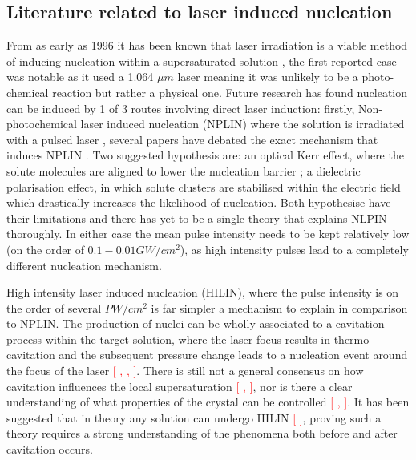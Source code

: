 \documentclass[a4paper,oneside,11pt]{book}
\begin{document}
\subsection{Literature related to laser induced nucleation}
From as early as 1996 it has been known that laser irradiation is a viable method of inducing nucleation within a supersaturated solution \cite{Garetz1996}, the first reported case was notable as it used a 1.064 $\mu m$ laser meaning it was unlikely to be a photo-chemical reaction but rather a physical one. Future research has found nucleation can be induced by 1 of 3 routes involving direct laser induction: firstly, Non-photochemical laser induced nucleation (NPLIN) where the solution is irradiated with a pulsed laser \cite{Garetz1996, Garetz2002,Sun2006}, several papers have debated the exact mechanism that induces NPLIN \cite{Garetz2002, Knott2011}. Two suggested hypothesis are: an optical Kerr effect, where the solute molecules are aligned to lower the nucleation barrier \cite{Knott2011}; a dielectric polarisation effect, in which solute clusters are stabilised within the electric field which drastically increases the likelihood of nucleation\cite{Alexander2008}. Both hypothesise have their limitations and there has yet to be a single theory that explains NLPIN thoroughly. In either case the mean pulse intensity needs to be kept relatively low (on the order of $0.1-0.01 GW/cm^2$), as high intensity pulses lead to a completely different nucleation mechanism.

High intensity laser induced nucleation (HILIN), where the pulse intensity is on the order of several $PW/cm^2$ is far simpler a mechanism to explain in comparison to NPLIN. The production of nuclei can be wholly associated to a cavitation process within the target solution, where the laser focus results in thermo-cavitation and the subsequent pressure change leads to a nucleation event around the focus of the laser \textcolor{red}{[ , , ]}. There is still not a general consensus on how cavitation influences the local supersaturation \textcolor{red}{[ , ]}, nor is there a clear understanding of what properties of the crystal can be controlled \textcolor{red}{[ , ]}. It has been suggested that in theory any solution can undergo HILIN \textcolor{red}{[ ]}, proving such a theory requires a strong understanding of the phenomena both before and after cavitation occurs.  
\end{document}
